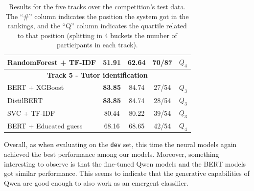 \documentclass[11pt]{article}
\begin{document}
\begin{table}[ht!]
{\begin{tabular}{lcccc}
RandomForest + TF-IDF & 51.91 & 62.64 & 70/87 & $Q_4$ \\
\hline
\multicolumn{5}{c}{\textbf{Track 5 - Tutor identification}} \\
\hline
BERT + XGBoost & \textbf{83.85} & 84.74 & 27/54 & $Q_3$  \\
DistilBERT & \textbf{83.85} & 84.74 & 28/54 & $Q_3$   \\
SVC + TF-IDF & 80.44 & 80.22 & 39/54 & $Q_3$  \\
BERT + Educated guess & 68.16 & 68.65 & 42/54 &  $Q_4$ \\
\hline
\end{tabular}
}
\caption{Results for the five tracks over the competition's test data. The ``\#'' column indicates the position the system got in the rankings, and the ``Q'' column indicates the quartile related to that position (splitting in 4 buckets the number of participants in each track).}
\label{tab:submissions}
\end{table}





Overall, as when evaluating on the \texttt{dev} set, this time the neural models again achieved the best performance among our models.
Moreover, something interesting to observe is that the fine-tuned Qwen models and the BERT models got similar performance. 
This seems to indicate that the generative capabilities of Qwen are good enough to also work as an emergent classifier.
\end{document}
